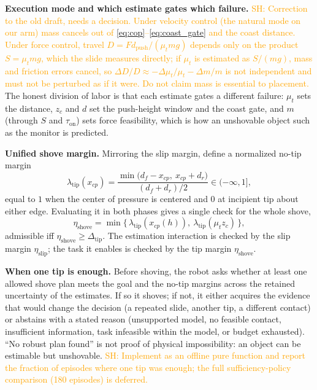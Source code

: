 \documentclass[10pt, conference]{IEEEtran}
\newcommand{\sh}[1]{\textcolor{orange}{SH: #1}}
\begin{document}
\noindent \textbf{Execution mode and which estimate gates which failure.} \sh{Correction to the old draft, needs a decision. Under velocity control (the natural mode on our arm) mass cancels out of \eqref{eq:cop}--\eqref{eq:coast_gate} and the coast distance. Under force control, travel $D = F d_{\mathrm{push}}/(\mu_t m g)$ depends only on the product $S = \mu_t m g$, which the slide measures directly; if $\mu_t$ is estimated as $S/(mg)$, mass and friction errors cancel, so $\Delta D/D \approx -\Delta\mu_t/\mu_t - \Delta m/m$ is not independent and must not be perturbed as if it were. Do not claim mass is essential to placement.} The honest division of labor is that each estimate gates a different failure: $\mu_t$ sets the distance, $z_c$ and $d$ set the push-height window and the coast gate, and $m$ (through $S$ and $\tau_{\mathrm{on}}$) sets force feasibility, which is how an unshovable object such as the monitor is predicted.

\noindent \textbf{Unified shove margin.} Mirroring the slip margin, define a normalized no-tip margin
\begin{equation}
    \lambda_{\mathrm{tip}}(x_{cp}) = \frac{\min\big(d_f - x_{cp},\ x_{cp}+d_r\big)}{(d_f+d_r)/2} \in (-\infty,1],
    \label{eq:lambda_tip}
\end{equation}
equal to $1$ when the center of pressure is centered and $0$ at incipient tip about either edge. Evaluating it in both phases gives a single check for the whole shove,
\begin{equation}
    \eta_{\mathrm{shove}} = \min\big\{\, \lambda_{\mathrm{tip}}(x_{cp}(h)),\ \lambda_{\mathrm{tip}}(\mu_t z_c) \,\big\},
    \label{eq:eta_shove}
\end{equation}
admissible iff $\eta_{\mathrm{shove}} \ge \Delta_{\mathrm{tip}}$. The estimation interaction is checked by the slip margin $\eta_{\mathrm{slip}}$; the task it enables is checked by the tip margin $\eta_{\mathrm{shove}}$.

\noindent \textbf{When one tip is enough.} Before shoving, the robot asks whether at least one allowed shove plan meets the goal and the no-tip margins across the retained uncertainty of the estimates. If so it shoves; if not, it either acquires the evidence that would change the decision (a repeated slide, another tip, a different contact) or abstains with a stated reason (unsupported model, no feasible contact, insufficient information, task infeasible within the model, or budget exhausted). ``No robust plan found'' is not proof of physical impossibility: an object can be estimable but unshovable. \sh{Implement as an offline pure function and report the fraction of episodes where one tip was enough; the full sufficiency-policy comparison (180 episodes) is deferred.}
\end{document}
